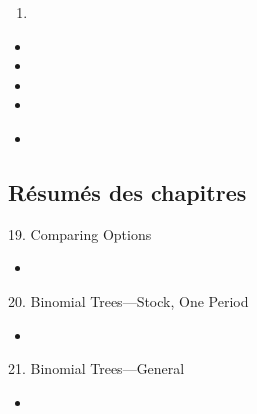 \documentclass[12pt, titlepage, french]{report}
\begin{document}
\begin{outcomes}
\begin{enumerate}
	\item	
\end{enumerate}
\end{outcomes}

\begin{ASM_chapter}
\begin{itemize}
	\item	{}
	\item	{}
	\item	{}
	\item	{}
\end{itemize}
\end{ASM_chapter}

\begin{YTB_vids}
\begin{itemize}
	\item	
\end{itemize}
\end{YTB_vids}

\subsection{Résumés des chapitres}

\begin{CHPT_SUMM_AUTO}[label = {L.-19}]{19. Comparing Options}
	\begin{itemize}
		\item	
	\end{itemize}
\end{CHPT_SUMM_AUTO}

\begin{CHPT_SUMM_AUTO}[label = {L.-20}]{{20. Binomial Trees---Stock, One Period}}
	\begin{itemize}
		\item	
	\end{itemize}
\end{CHPT_SUMM_AUTO}

\begin{CHPT_SUMM_AUTO}[label = {L.-21}]{21. Binomial Trees---General}
	\begin{itemize}
		\item	
	\end{itemize}
\end{CHPT_SUMM_AUTO}
\end{document}
